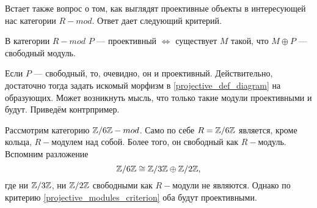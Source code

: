 \documentclass[../main.tex]{subfiles}
\begin{document}
Встает также вопрос о том, как выглядят проективные объекты в интересующей нас категории $R-mod$. Ответ дает следующий критерий.
\begin{to_suj}\label{projective_modules_criterion}
В категории $R-mod$ $P$ --- проективный $\iff$ существует $M$ такой, что $M\oplus P$ --- свободный модуль.
\end{to_suj}
\begin{to_com}
Если $P$ --- свободный, то, очевидно, он и проективный. Действительно, достаточно тогда задать искомый морфизм в \eqref{projective_def_diagram} на образующих. Может возникнуть мысль, что только такие модули проективными и будут. Приведём контрпример.
\end{to_com}
\begin{to_ex}
Рассмотрим категорию $\mathbb{Z}/6\mathbb{Z}-mod$. Само по себе $R = \mathbb{Z}/6\mathbb{Z}$ является, кроме кольца, $R-$модулем над собой. Более того, он свободный как $R-$модуль. Вспомним разложение
\begin{equation*}
    \mathbb{Z}/6\mathbb{Z} \cong \mathbb{Z}/3\mathbb{Z} \oplus \mathbb{Z}/2\mathbb{Z},
\end{equation*}
где ни $\mathbb{Z}/3\mathbb{Z}$, ни $\mathbb{Z}/2\mathbb{Z}$ свободными как $R-$модули не являются. Однако по критерию \ref{projective_modules_criterion} оба будут проективными.
\end{to_ex}
\end{document}
